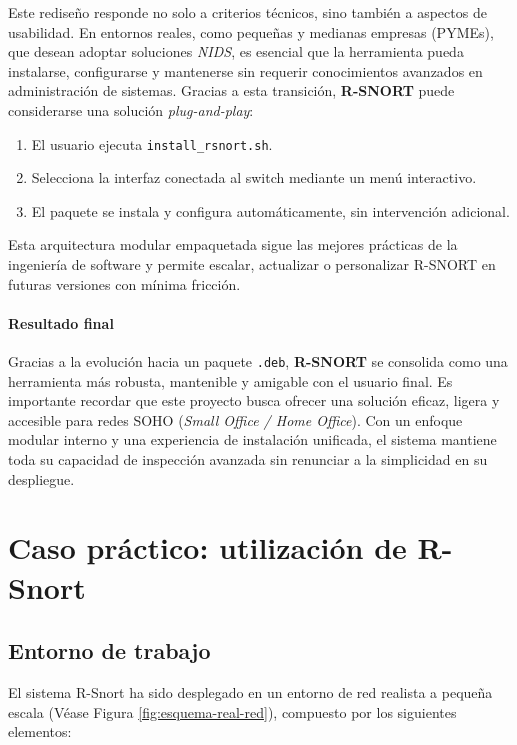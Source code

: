 \documentclass[11pt,a4paper,twoside]{report}
\begin{document}
Este rediseño responde no solo a criterios técnicos, sino también a aspectos de usabilidad. En entornos reales, como pequeñas y medianas empresas (PYMEs), que desean adoptar soluciones \textit{NIDS}, es esencial que la herramienta pueda instalarse, configurarse y mantenerse sin requerir conocimientos avanzados en administración de sistemas. Gracias a esta transición, \textbf{R-SNORT} puede considerarse una solución \textit{plug-and-play}:

\begin{enumerate}
	\item El usuario ejecuta \texttt{install\_rsnort.sh}.
	\item Selecciona la interfaz conectada al switch mediante un menú interactivo.
	\item El paquete se instala y configura automáticamente, sin intervención adicional.
\end{enumerate}

Esta arquitectura modular empaquetada sigue las mejores prácticas de la ingeniería de software y permite escalar, actualizar o personalizar R-SNORT en futuras versiones con mínima fricción.

\subsubsection{Resultado final}

Gracias a la evolución hacia un paquete \texttt{.deb}, \textbf{R-SNORT} se consolida como una herramienta más robusta, mantenible y amigable con el usuario final. Es importante recordar que este proyecto busca ofrecer una solución eficaz, ligera y accesible para redes SOHO (\textit{Small Office / Home Office}). Con un enfoque modular interno y una experiencia de instalación unificada, el sistema mantiene toda su capacidad de inspección avanzada sin renunciar a la simplicidad en su despliegue.

\clearpage
\null
\thispagestyle{empty}
\newpage

\chapter{Caso práctico: utilización de R-Snort}

\section{Entorno de trabajo}

El sistema R-Snort ha sido desplegado en un entorno de red realista a pequeña escala (Véase Figura \ref{fig:esquema-real-red}), compuesto por los siguientes elementos:
\end{document}
